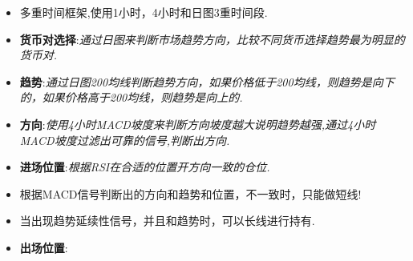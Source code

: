 
%


\begin{itemize}
\item 多重时间框架,使用1小时，4小时和日图3重时间段.
\item \textbf{货币对选择}:\textit{通过日图来判断市场趋势方向，比较不同货币选择趋势最为明显的货币对.}
\item \textbf{趋势}:\textit{通过日图200均线判断趋势方向，如果价格低于200均线，则趋势是向下的，如果价格高于200均线，则趋势是向上的.}
\item \textbf{方向}:\textit{使用4小时MACD坡度来判断方向坡度越大说明趋势越强,通过4小时MACD坡度过滤出可靠的信号,判断出方向.}
\item \textbf{进场位置}:\textit{根据RSI在合适的位置开方向一致的仓位.}
\item 根据MACD信号判断出的方向和趋势和位置，不一致时，只能做短线!
\item 当出现趋势延续性信号，并且和趋势时，可以长线进行持有.
\item \textbf{出场位置}:
\end{itemize}








